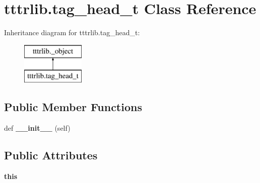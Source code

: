 \hypertarget{classtttrlib_1_1tag__head__t}{}\section{tttrlib.\+tag\+\_\+head\+\_\+t Class Reference}
\label{classtttrlib_1_1tag__head__t}
Inheritance diagram for tttrlib.\+tag\+\_\+head\+\_\+t\+:\begin{figure}[H]
\begin{center}
\leavevmode
\includegraphics[height=2.000000cm]{classtttrlib_1_1tag__head__t}
\end{center}
\end{figure}
\subsection*{Public Member Functions}
\begin{DoxyCompactItemize}
\item 
\mbox{\label{classtttrlib_1_1tag__head__t_a8ef3fbafa6b2312691f9cc2cab4a5d34}} 
def {\bfseries \+\_\+\+\_\+init\+\_\+\+\_\+} (self)
\end{DoxyCompactItemize}
\subsection*{Public Attributes}
\begin{DoxyCompactItemize}
\item 
\mbox{\label{classtttrlib_1_1tag__head__t_a6eeb77e1707a04ef510316074fc24b77}} 
{\bfseries this}
\end{DoxyCompactItemize}

